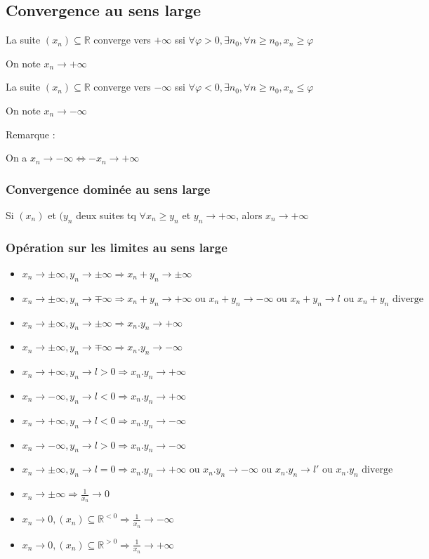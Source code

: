 \documentclass[a4paper,10pt]{article}
\newcommand{\ap}{\rightarrow}
\newcommand{\R}{\mathbb{R}}
\newcommand{\so}{\Rightarrow}
\newcommand{\ioi}{\Leftrightarrow}
\begin{document}
\subsection{Convergence au sens large}

La suite $(x_n) \subseteq \R$ converge vers $+\infty$ ssi $\forall \varphi > 0, \exists n_0, \forall n \geq n_0, x_n \geq \varphi$

On note $x_n \ap +\infty$

La suite $(x_n) \subseteq \R$ converge vers $-\infty$ ssi $\forall \varphi < 0, \exists n_0, \forall n \geq n_0, x_n \leq \varphi$

On note $x_n \ap -\infty$

Remarque :

On a $x_n \ap -\infty \ioi -x_n \ap +\infty$

\subsubsection{Convergence dominée au sens large}

Si $(x_n)$ et $(y_n$ deux suites tq $\forall x_n \geq y_n$ et $y_n \ap +\infty$, alors $x_n \ap +\infty$

\subsubsection{Opération sur les limites au sens large}

\begin{itemize}
	\item{$x_n \ap \pm \infty, y_n \ap \pm \infty \so x_n + y_n \ap \pm \infty$}
	\item{$x_n \ap \pm \infty, y_n \ap \mp \infty \so x_n + y_n \ap +\infty \mbox{ ou } x_n + y_n \ap -\infty \mbox{ ou } x_n + y_n \ap l \mbox{ ou } x_n + y_n \mbox{ diverge}$}
	\item{$x_n \ap \pm \infty, y_n \ap \pm \infty \so x_n . y_n \ap +\infty$}
	\item{$x_n \ap \pm \infty, y_n \ap \mp \infty \so x_n . y_n \ap -\infty$}
	\item{$x_n \ap +\infty, y_n \ap l > 0 \so x_n . y_n \ap +\infty$}
	\item{$x_n \ap -\infty, y_n \ap l < 0 \so x_n . y_n \ap +\infty$}
	\item{$x_n \ap +\infty, y_n \ap l < 0 \so x_n . y_n \ap -\infty$}
	\item{$x_n \ap -\infty, y_n \ap l > 0 \so x_n . y_n \ap -\infty$}
	\item{$x_n \ap \pm \infty, y_n \ap l = 0 \so x_n . y_n \ap +\infty \mbox{ ou } x_n . y_n \ap -\infty \mbox{ ou } x_n . y_n \ap l' \mbox{ ou } x_n . y_n \mbox{ diverge}$}
	\item{$x_n \ap \pm \infty \so \frac{1}{x_n} \ap 0$}
	\item{$x_n \ap 0, (x_n) \subseteq \R^{<0} \so \frac{1}{x_n} \ap -\infty$}
	\item{$x_n \ap 0, (x_n) \subseteq \R^{>0} \so \frac{1}{x_n} \ap +\infty$}
\end{itemize}
\end{document}
